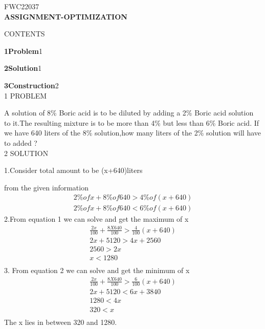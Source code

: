 \documentclass[a4paper,10pt]{report}
\begin{document}
\raggedleft FWC22037\vspace{2mm}\\
\centering\Large\textbf{ASSIGNMENT-OPTIMIZATION}\vspace{5mm}
\begin{multicols}{2}
\centering \large\textsc{C}\footnotesize\textsc{ONTENTS}\vspace{5mm}\\
\raggedright\large\textbf{1\hspace{1cm}Problem}\hspace{5.2cm}1\vspace{5mm}\\
\raggedright\large\textbf{2\hspace{1cm}Solution}\hspace{5.25cm}1\vspace{5mm}\\
\raggedright\large\textbf{3\hspace{1cm}Construction}\hspace{4.25cm}2\vspace{5mm}\\
\centering \large\textsc{1  P}\footnotesize\textsc{ROBLEM}\vspace{5mm}\\
	\raggedright\large{A solution of 8\% Boric acid is to be diluted by adding a 2\% Boric acid solution to it.The resulting mixture is to be more than 4\% but less than 6\% Boric acid. If we have 640 liters of the 8\% solution,how many liters of the 2\% solution will have to added ?}\\\vspace{5mm}
\centering \large\textsc{2  S}\footnotesize\textsc{OLUTION}\vspace{5mm}\\
\raggedright\large{1.Consider total amount to be (x+640)liters\\}
\raggedright from the given information \\
\begin{align}
2\% of x + 8\% of 640 > 4\% of (x+640) \\
2\% of x + 8\% of 640 < 6\% of (x+640)
\end{align}
2.From equation 1 we can solve and get the maximum of x\\
\begin{gather*}
\frac{2x}{100} + \frac{8X640}{100}  > \frac{4}{100}(x+640)\\
2x+5120 > 4x+2560\\
2560 > 2x \\
x<1280\\
\end{gather*}
3. From equation 2 we can solve and get the minimum of x\\
\begin{gather*} 
 \frac{2x}{100} + \frac{8X640}{100}  > \frac{6}{100}(x+640)\\
 2x+5120 < 6x+3840\\
 1280<4x\\
 320<x\\
 \end{gather*}
 The x lies in between 320 and 1280.
 \vspace{10mm}



\end{multicols}
\end{document}
